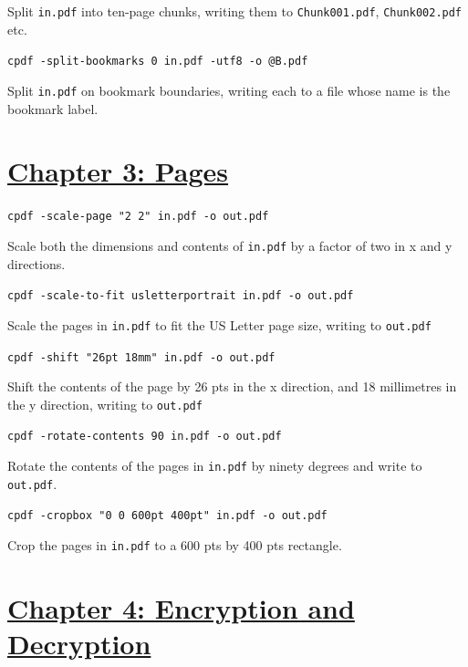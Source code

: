 \documentclass{book}
\begin{document}
\noindent Split \texttt{in.pdf} into ten-page chunks, writing them to \texttt{Chunk001.pdf}, \texttt{Chunk002.pdf} etc.

\begin{framed}\noindent\texttt{cpdf -split-bookmarks 0 in.pdf -utf8 -o @B.pdf}\end{framed}

\noindent Split \texttt{in.pdf} on bookmark boundaries, writing each to a file whose name is the bookmark label.

\section*{\hyperref[chap:3]{Chapter 3: Pages}}

\begin{framed}\noindent\texttt{cpdf -scale-page "2 2" in.pdf -o out.pdf}\end{framed}

\noindent Scale both the dimensions and contents of \texttt{in.pdf} by a factor of two in x and y directions.

\begin{framed}\noindent\texttt{cpdf -scale-to-fit usletterportrait in.pdf -o out.pdf}\end{framed}

\noindent Scale the pages in \texttt{in.pdf} to fit the US Letter page size, writing to \texttt{out.pdf}

\begin{framed}\noindent\texttt{cpdf -shift "26pt 18mm" in.pdf -o out.pdf}\end{framed}

\noindent Shift the contents of the page by 26 pts in the x direction, and 18 millimetres in the y direction, writing to \texttt{out.pdf}

\begin{framed}\noindent\texttt{cpdf -rotate-contents 90 in.pdf -o out.pdf}\end{framed}

\noindent Rotate the contents of the pages in \texttt{in.pdf} by ninety degrees and write to \texttt{out.pdf}.

\begin{framed}\noindent\texttt{cpdf -cropbox "0 0 600pt 400pt" in.pdf -o out.pdf}\end{framed}

\noindent Crop the pages in \texttt{in.pdf} to a 600 pts by 400 pts rectangle.


\section*{\hyperref[chap:4]{Chapter 4: Encryption and Decryption}}
\end{document}
